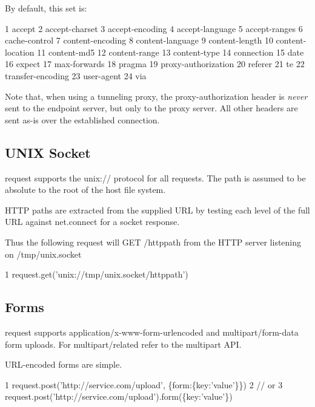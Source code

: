 By default, this set is\+:


\begin{DoxyCode}
1 accept
2 accept-charset
3 accept-encoding
4 accept-language
5 accept-ranges
6 cache-control
7 content-encoding
8 content-language
9 content-length
10 content-location
11 content-md5
12 content-range
13 content-type
14 connection
15 date
16 expect
17 max-forwards
18 pragma
19 proxy-authorization
20 referer
21 te
22 transfer-encoding
23 user-agent
24 via
\end{DoxyCode}


Note that, when using a tunneling proxy, the {\ttfamily proxy-\/authorization} header is {\itshape never} sent to the endpoint server, but only to the proxy server. All other headers are sent as-\/is over the established connection.

\subsection*{U\+N\+I\+X Socket}

{\ttfamily request} supports the {\ttfamily unix\+://} protocol for all requests. The path is assumed to be absolute to the root of the host file system.

H\+T\+T\+P paths are extracted from the supplied U\+R\+L by testing each level of the full U\+R\+L against net.\+connect for a socket response.

Thus the following request will G\+E\+T {\ttfamily /httppath} from the H\+T\+T\+P server listening on {\ttfamily /tmp/unix.socket}


\begin{DoxyCode}
1 request.get('unix://tmp/unix.socket/httppath')
\end{DoxyCode}


\subsection*{Forms}

{\ttfamily request} supports {\ttfamily application/x-\/www-\/form-\/urlencoded} and {\ttfamily multipart/form-\/data} form uploads. For {\ttfamily multipart/related} refer to the {\ttfamily multipart} A\+P\+I.

U\+R\+L-\/encoded forms are simple.


\begin{DoxyCode}
1 request.post('http://service.com/upload', \{form:\{key:'value'\}\})
2 // or
3 request.post('http://service.com/upload').form(\{key:'value'\})
\end{DoxyCode}


